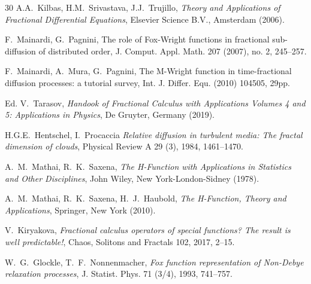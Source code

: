 \documentclass[12pt]{article}
\theoremstyle{definition}
\begin{document}
\begin{thebibliography}{30}
 A.A.~Kilbas, H.M.~Srivastava, J.J.~Trujillo, \textit{Theory and Applications of Fractional Differential Equations}, Elsevier Science B.V., Amsterdam (2006).

 F.~Mainardi, G.~Pagnini, The role of Fox-Wright functions in fractional sub-diffusion of distributed order, J. Comput. Appl. Math. 207 (2007), no. 2, 245--257.

 F.~Mainardi, A.~Mura, G.~Pagnini,
The M-Wright function in time-fractional diffusion processes: a tutorial survey, Int. J. Differ. Equ. (2010) 104505, 29pp.












 Ed. V.~Tarasov, \textit{Handook of Fractional Calculus with Applications Volumes 4 and 5: Applications in Physics}, De Gruyter, Germany (2019).



 H.G.E.~Hentschel, I.~Procaccia \textit{Relative diffusion in turbulent media: The fractal dimension of clouds}, Physical Review A 29 (3), 1984, 1461--1470.

    A.~M.~Mathai, R.~K.~Saxena, \textit{The H-Function with Applications in Statistics and Other Disciplines}, John Wiley, New York-London-Sidney (1978). 

 A.~M.~Mathai, R.~K.~Saxena, H.~J.~Haubold, \textit{The H-Function, Theory and Applications}, Springer, New York (2010).




         V.~Kiryakova, \textit{Fractional calculus operators of special functions? The result is well predictable!}, Chaos, Solitons and Fractals 102, 2017, 2--15.

         W.~G.~Glockle, T.~F.~Nonnenmacher, \textit{Fox function representation of Non-Debye relaxation processes}, J. Statist. Phys. 71 (3/4), 1993, 741--757.














\end{thebibliography}
\end{document}
